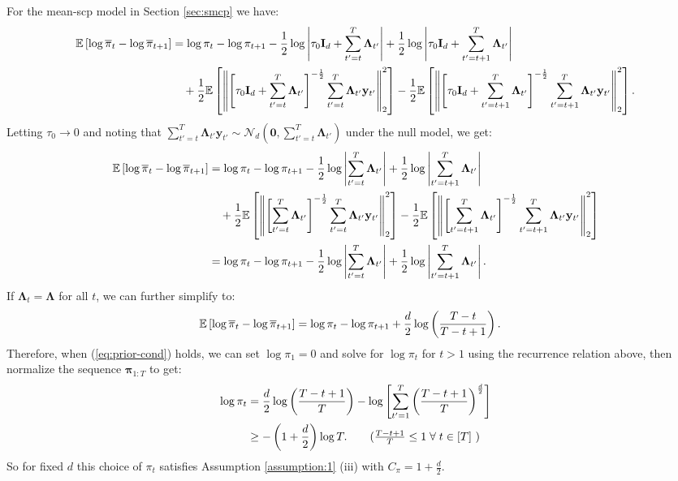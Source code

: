 For the mean-scp model in Section \ref{sec:smcp} we have:
\small
\begin{align*}
    \mathbb{E}\left[\log\overline{\pi}_t - \log \overline{\pi}_{t+1} \right] &= \log \pi_t - \log \pi_{t+1} - \frac{1}{2} \log \left|\tau_0\mathbf{I}_d + \sum_{t'=t}^{T} \boldsymbol{\Lambda}_{t'}\right| + \frac{1}{2} \log \left|\tau_0\mathbf{I}_d + \sum_{t'=t+1}^{T} \boldsymbol{\Lambda}_{t'}\right|\\
    &\quad + \frac{1}{2} \mathbb{E}\left[\left\lVert \left[\tau_0\mathbf{I}_d + \sum_{t'=t}^{T} \boldsymbol{\Lambda}_{t'}\right]^{-\frac{1}{2}} \sum_{t'=t}^{T} \boldsymbol{\Lambda}_{t'} \mathbf{y}_{t'}\right\rVert_2^2 \right] - \frac{1}{2} \mathbb{E}\left[\left\lVert \left[\tau_0\mathbf{I}_d + \sum_{t'=t+1}^{T} \boldsymbol{\Lambda}_{t'}\right]^{-\frac{1}{2}} \sum_{t'=t+1}^{T} \boldsymbol{\Lambda}_{t'} \mathbf{y}_{t'}\right\rVert_2^2 \right].
\end{align*}
\normalsize
Letting $\tau_0 \to 0$ and noting that $\sum_{t'=t}^{T} \boldsymbol{\Lambda}_{t'} \mathbf{y}_{t'} \sim \mathcal{N}_d\left(\mathbf{0}, \sum_{t'=t}^{T} \boldsymbol{\Lambda}_{t'}\right)$ under the null model, we get:
\small
\begin{align*}
    \mathbb{E}\left[\log\overline{\pi}_t - \log \overline{\pi}_{t+1} \right] &= \log \pi_t - \log \pi_{t+1} - \frac{1}{2} \log \left|\sum_{t'=t}^{T} \boldsymbol{\Lambda}_{t'}\right| + \frac{1}{2} \log \left|\sum_{t'=t+1}^{T} \boldsymbol{\Lambda}_{t'}\right|\\
    &\quad + \frac{1}{2} \mathbb{E}\left[\left\lVert \left[ \sum_{t'=t}^{T} \boldsymbol{\Lambda}_{t'}\right]^{-\frac{1}{2}} \sum_{t'=t}^{T} \boldsymbol{\Lambda}_{t'} \mathbf{y}_{t'}\right\rVert_2^2  \right] - \frac{1}{2} \mathbb{E}\left[\left\lVert \left[\sum_{t'=t+1}^{T} \boldsymbol{\Lambda}_{t'}\right]^{-\frac{1}{2}} \sum_{t'=t+1}^{T} \boldsymbol{\Lambda}_{t'} \mathbf{y}_{t'}\right\rVert_2^2  \right]\\
    &= \log \pi_t - \log \pi_{t+1} - \frac{1}{2} \log \left|\sum_{t'=t}^{T} \boldsymbol{\Lambda}_{t'}\right| + \frac{1}{2} \log \left|\sum_{t'=t+1}^{T} \boldsymbol{\Lambda}_{t'}\right|.
\end{align*}
\normalsize
If $\boldsymbol{\Lambda}_t = \boldsymbol{\Lambda}$ for all $t$, we can further simplify to:
\begin{align*}
    \mathbb{E}\left[\log\overline{\pi}_t - \log \overline{\pi}_{t+1} \right] &= \log \pi_t - \log \pi_{t+1} + \frac{d}{2} \log\left(\frac{T-t}{T-t+1}\right).
\end{align*}
Therefore, when (\ref{eq:prior-cond}) holds, we can set $\log \pi_1 = 0$ and solve for $\log \pi_t$ for $t > 1$ using the recurrence relation above, then normalize the sequence $\boldsymbol{\pi}_{1:T}$ to get:
\begin{align*}
    \log \pi_t &= \frac{d}{2}\log\left(\frac{T-t+1}{T}\right) - \log\left[\sum_{t'=1}^T \left(\frac{T-t+1}{T}\right)^{\frac{d}{2}}\right] \\
    &\geq - \left(1 + \frac{d}{2}\right)\log T. \tag{$\frac{T-t+1}{T} \leq 1 \sforall t \in [T]$ }
\end{align*}
So for fixed $d$ this choice of $\pi_t$ satisfies Assumption \ref{assumption:1} (iii) with $C_\pi = 1 + \frac{d}{2}$.

